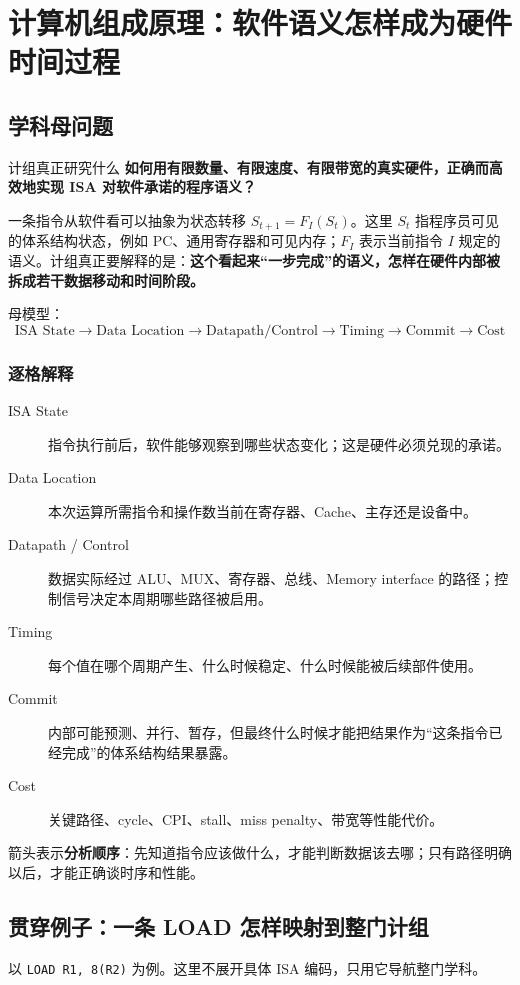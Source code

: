 \documentclass[11pt,a4paper,openany]{ctexbook}
\newcommand{\key}[1]{\textbf{\color{deep}#1}}
\begin{document}
\chapter{计算机组成原理：软件语义怎样成为硬件时间过程}

\section{学科母问题}
\begin{corebox}{计组真正研究什么}
\key{如何用有限数量、有限速度、有限带宽的真实硬件，正确而高效地实现 ISA 对软件承诺的程序语义？}
\end{corebox}

一条指令从软件看可以抽象为状态转移 $S_{t+1}=F_I(S_t)$。这里 $S_t$ 指程序员可见的体系结构状态，例如 PC、通用寄存器和可见内存；$F_I$ 表示当前指令 $I$ 规定的语义。计组真正要解释的是：\key{这个看起来“一步完成”的语义，怎样在硬件内部被拆成若干数据移动和时间阶段。}

母模型：
\[
\boxed{\text{ISA State}\rightarrow\text{Data Location}\rightarrow\text{Datapath/Control}\rightarrow\text{Timing}\rightarrow\text{Commit}\rightarrow\text{Cost}}
\]

\subsection{逐格解释}
\begin{description}
  \item[ISA State] 指令执行前后，软件能够观察到哪些状态变化；这是硬件必须兑现的承诺。
  \item[Data Location] 本次运算所需指令和操作数当前在寄存器、Cache、主存还是设备中。
  \item[Datapath / Control] 数据实际经过 ALU、MUX、寄存器、总线、Memory interface 的路径；控制信号决定本周期哪些路径被启用。
  \item[Timing] 每个值在哪个周期产生、什么时候稳定、什么时候能被后续部件使用。
  \item[Commit] 内部可能预测、并行、暂存，但最终什么时候才能把结果作为“这条指令已经完成”的体系结构结果暴露。
  \item[Cost] 关键路径、cycle、CPI、stall、miss penalty、带宽等性能代价。
\end{description}
箭头表示\key{分析顺序}：先知道指令应该做什么，才能判断数据该去哪；只有路径明确以后，才能正确谈时序和性能。

\section{贯穿例子：一条 LOAD 怎样映射到整门计组}
以 \texttt{LOAD R1, 8(R2)} 为例。这里不展开具体 ISA 编码，只用它导航整门学科。
\end{document}
